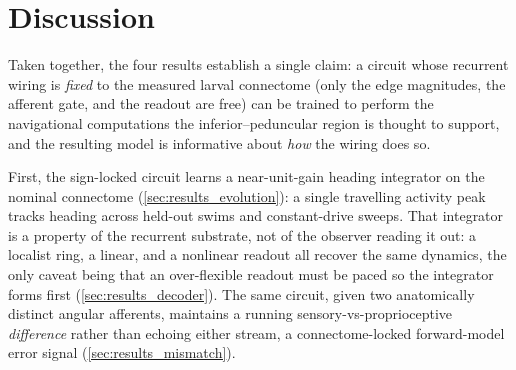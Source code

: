 \documentclass[11pt]{article}
\begin{document}
\section{Discussion}
\label{sec:discussion}

Taken together, the four results establish a single claim: a circuit whose
recurrent wiring is \emph{fixed} to the measured larval connectome (only
the edge magnitudes, the afferent gate, and the readout are free) can be
trained to perform the navigational computations the inferior--peduncular
region is thought to support, and the resulting model is informative about
\emph{how} the wiring does so.

First, the sign-locked circuit learns a near-unit-gain heading integrator
on the nominal connectome (\cref{sec:results_evolution}): a single
travelling activity peak tracks heading across held-out swims and
constant-drive sweeps. That integrator is a property of the recurrent
substrate, not of the observer reading it out: a localist ring, a
linear, and a nonlinear readout all recover the same dynamics, the only
caveat being that an over-flexible readout must be paced so the integrator
forms first (\cref{sec:results_decoder}). The same circuit, given two
anatomically distinct angular afferents, maintains a running
sensory-vs-proprioceptive \emph{difference} rather than echoing either
stream, a connectome-locked forward-model error signal
(\cref{sec:results_mismatch}).
\end{document}
